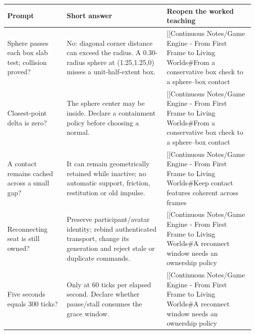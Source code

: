 {\def\LTcaptype{none} %
\begin{longtable}[]{@{}
  >{\raggedright\arraybackslash}p{}
  >{\raggedright\arraybackslash}p{}
  >{\raggedright\arraybackslash}p{}@{}}
\toprule\noalign{}
\begin{minipage}[b]{\linewidth}\raggedright
Prompt
\end{minipage} & \begin{minipage}[b]{\linewidth}\raggedright
Short answer
\end{minipage} & \begin{minipage}[b]{\linewidth}\raggedright
Reopen the worked teaching
\end{minipage} \\
\midrule\noalign{}
\endhead
\bottomrule\noalign{}
\endlastfoot
Sphere passes each box slab test; collision proved? & No: diagonal corner distance can exceed the radius. A 0.30-radius sphere at (1.25,1.25,0) misses a unit-half-extent box. & {[}{[}Continuous Notes/Game Engine - From First Frame to Living Worlds\#From a conservative box check to a sphere--box contact \\
Closest-point delta is zero? & The sphere center may be inside. Declare a containment policy before choosing a normal. & {[}{[}Continuous Notes/Game Engine - From First Frame to Living Worlds\#From a conservative box check to a sphere--box contact \\
A contact remains cached across a small gap? & It can remain geometrically retained while inactive; no automatic support, friction, restitution or old impulse. & {[}{[}Continuous Notes/Game Engine - From First Frame to Living Worlds\#Keep contact features coherent across frames \\
Reconnecting seat is still owned? & Preserve participant/avatar identity; rebind authenticated transport, change its generation and reject stale or duplicate commands. & {[}{[}Continuous Notes/Game Engine - From First Frame to Living Worlds\#A reconnect window needs an ownership policy \\
Five seconds equals 300 ticks? & Only at 60 ticks per elapsed second. Declare whether pause/stall consumes the grace window. & {[}{[}Continuous Notes/Game Engine - From First Frame to Living Worlds\#A reconnect window needs an ownership policy \\
\end{longtable}
}

